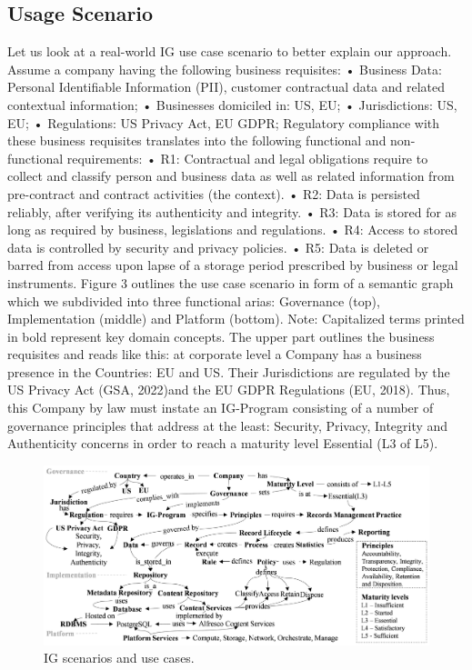 \documentclass[a4paper,twoside]{article}
\begin{document}
\subsection{Usage Scenario}
Let us look at a real-world IG use case scenario to better explain our approach. Assume a company having the following business requisites: 
•	Business Data: Personal Identifiable Information (PII), customer contractual data and related contextual information; 
•	Businesses domiciled in: US, EU; 
•	Jurisdictions: US, EU; 
•	Regulations: US Privacy Act, EU GDPR; 
Regulatory compliance with these business requisites translates into the following functional and non-functional requirements:
•	R1: Contractual and legal obligations require to collect and classify person and business data as well as related information from pre-contract and contract activities (the context). 
•	 R2: Data is persisted reliably, after verifying its authenticity and integrity. 
•	R3: Data is stored for as long as required by business, legislations and regulations. 
•	R4: Access to stored data is controlled by security and privacy policies. 
•	R5: Data is deleted or barred from access upon lapse of a storage period prescribed by business or legal instruments. 
Figure 3 outlines the use case scenario in form of a semantic graph which we subdivided into three functional arias: Governance (top), Implementation (middle) and Platform (bottom). Note: Capitalized terms printed in bold represent key domain concepts. 
The upper part outlines the business requisites and reads like this: at corporate level a Company has a business presence in the Countries: EU and US. Their Jurisdictions are regulated by the US Privacy Act (GSA, 2022)and the EU GDPR Regulations (EU, 2018). Thus, this Company by law must instate an IG-Program consisting of a number of governance principles that address at the least: Security, Privacy, Integrity and Authenticity concerns in order to reach a maturity level Essential (L3 of L5).
%
\begin{figure}[!hbtp]
  \centering
   \includegraphics[width=\textwidth]{images/Fig3-IG.Scenario.png}
    \caption{IG scenarios and use cases.}
  \label{fig:scenarios}
\end{figure}
\end{document}
